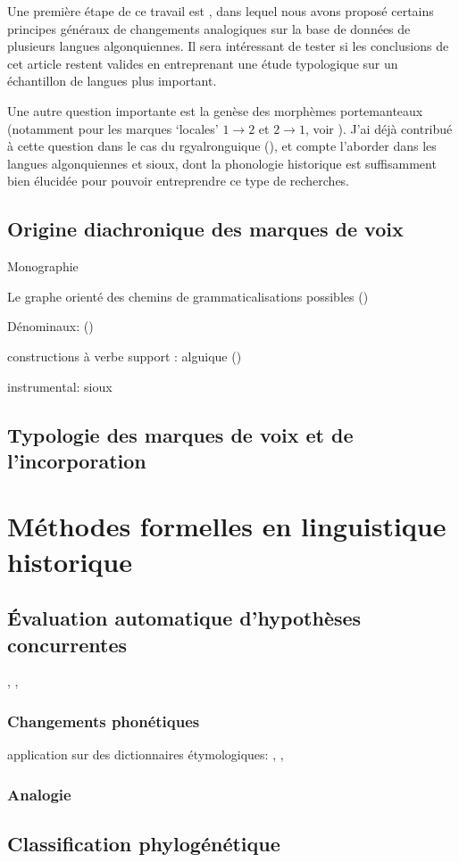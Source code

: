 \documentclass[oldfontcommands,oneside,a4paper,11pt]{article}
\begin{document}
Une première étape de ce travail est \citet{jacques15directionality}, dans lequel nous avons proposé certains principes généraux de changements analogiques sur la base de données de plusieurs langues algonquiennes. Il sera intéressant de tester si les conclusions de cet article restent valides en entreprenant une étude typologique sur un échantillon de langues plus important.
 
 Une autre question importante est la genèse des morphèmes portemanteaux  (notamment pour les marques `locales' $1\rightarrow2$ et $2\rightarrow1$, voir \citealt{heath98skewing}). J'ai déjà contribué à cette question dans le cas du rgyalronguique (\citealt{jacques15generic}), et compte l'aborder dans les langues algonquiennes et sioux, dont la phonologie historique est suffisamment bien élucidée pour pouvoir entreprendre ce type de recherches. 
 
 
 \subsection{Origine diachronique des marques de voix} 
 Monographie 
 
 
 Le graphe orienté des chemins de grammaticalisations possibles
 (\citealt{haspelmath90passive})
 
Dénominaux: (\citealt{jacques14antipassive})

constructions à verbe support : alguique  (\citealt{garrett04stem.structure})
 
 instrumental: sioux
 
 \subsection{Typologie des marques de voix et de l'incorporation} 
  
\section{Méthodes formelles en linguistique historique}

\subsection{Évaluation automatique d'hypothèses concurrentes}


\citet{rissanen84}, \citet{walther14compactness}, 
\subsubsection{Changements phonétiques}
application sur des dictionnaires étymologiques: \citet{csd2006}, \citet{hewson93proto}, \citet{hewson11roots}
\subsubsection{Analogie}

\subsection{Classification phylogénétique}



 
\end{document}
